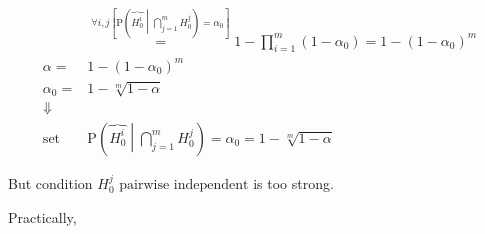 \documentclass[
]{book}
\theoremstyle{definition}
\theoremstyle{definition}
\theoremstyle{definition}
\theoremstyle{definition}
\theoremstyle{remark}
\begin{document}
\[\begin{aligned}
 & \overset{\forall i,j\left[\mathrm{P}\left(\overbrace{H_{{\scriptscriptstyle 0}}^{{\scriptscriptstyle i}}}\middle|\bigcap\limits _{j=1}^{m}H_{{\scriptscriptstyle 0}}^{{\scriptscriptstyle j}}\right)=\alpha_{{\scriptscriptstyle 0}}\right]}{=}1-\prod\limits _{i=1}^{m}\left(1-\alpha_{{\scriptscriptstyle 0}}\right)=1-\left(1-\alpha_{{\scriptscriptstyle 0}}\right)^{m}\\
\alpha= & 1-\left(1-\alpha_{{\scriptscriptstyle 0}}\right)^{m}\\
\alpha_{{\scriptscriptstyle 0}}= & 1-\sqrt[m]{1-\alpha}\\
\Downarrow\\
\text{set } & \mathrm{P}\left(\overbrace{H_{{\scriptscriptstyle 0}}^{{\scriptscriptstyle i}}}\middle|\bigcap\limits _{j=1}^{m}H_{{\scriptscriptstyle 0}}^{{\scriptscriptstyle j}}\right)=\alpha_{{\scriptscriptstyle 0}}=1-\sqrt[m]{1-\alpha}
\end{aligned}
\]

But condition \(H_{{\scriptscriptstyle 0}}^{{\scriptscriptstyle j}}\text{ pairwise independent}\) is too strong.

Practically,
\end{document}
